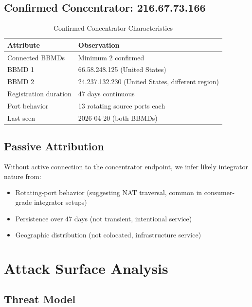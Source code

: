 \documentclass[11pt,a4paper]{article}
\begin{document}
\subsection{Confirmed Concentrator: 216.67.73.166}

\begin{table}[h]
\centering
\begin{tabular}{ll}
\toprule
\textbf{Attribute} & \textbf{Observation} \\
\midrule
Connected BBMDs & Minimum 2 confirmed \\
BBMD 1 & 66.58.248.125 (United States) \\
BBMD 2 & 24.237.132.230 (United States, different region) \\
Registration duration & 47 days continuous \\
Port behavior & 13 rotating source ports each \\
Last seen & 2026-04-20 (both BBMDs) \\
\bottomrule
\end{tabular}
\caption{Confirmed Concentrator Characteristics}
\label{tab:concentrator}
\end{table}

\subsection{Passive Attribution}

Without active connection to the concentrator endpoint, we infer likely 
integrator nature from:

\begin{itemize}
  \item Rotating-port behavior (suggesting NAT traversal, common in 
    consumer-grade integrator setups)
  \item Persistence over 47 days (not transient, intentional service)
  \item Geographic distribution (not colocated, infrastructure service)
\end{itemize}

\section{Attack Surface Analysis}
\label{sec:attacks}

\subsection{Threat Model}
\end{document}
